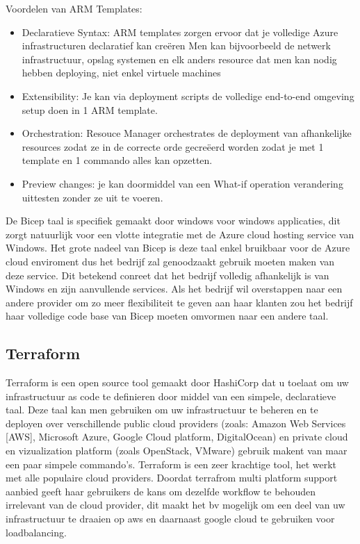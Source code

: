 Voordelen van ARM Templates:
\begin{itemize}
    \item Declaratieve Syntax: ARM templates zorgen ervoor dat je volledige Azure infrastructuren declaratief kan creëren
    Men kan bijvoorbeeld de netwerk infrastructuur, opslag systemen en elk anders resource dat men kan nodig hebben deploying, niet enkel virtuele machines
    \item Extensibility: Je kan via deployment scripts de volledige end-to-end omgeving  setup doen in 1 ARM template.
    \item Orchestration: Resouce Manager orchestrates de deployment van afhankelijke resources zodat ze in de correcte orde gecreëerd worden zodat je met 1 template en 1 commando alles kan opzetten.
    \item Preview changes: je kan doormiddel van een What-if operation verandering uittesten 
    zonder ze uit te voeren.
\end{itemize}
\autocite{ARMTemplates2022}


De Bicep taal is specifiek gemaakt door windows voor windows applicaties, dit zorgt natuurlijk voor een vlotte integratie met de Azure cloud hosting service van Windows.
Het grote nadeel van Bicep is deze taal enkel bruikbaar voor de Azure cloud enviroment dus het bedrijf zal genoodzaakt gebruik moeten maken van deze service.
Dit betekend conreet dat het bedrijf volledig afhankelijk is van Windows en zijn aanvullende services. Als het bedrijf wil overstappen naar een andere provider om zo meer flexibiliteit te geven aan haar klanten
zou het bedrijf haar volledige code base van Bicep moeten omvormen naar een andere taal. 

\subsection{Terraform}%

Terraform is een open source tool gemaakt door HashiCorp dat u toelaat om uw infrastructuur as code te definieren door middel van een simpele, declaratieve taal.
Deze taal kan men gebruiken om  uw infrastructuur te beheren en te deployen over verschillende public cloud providers (zoals: Amazon Web Services [AWS], Microsoft Azure, Google Cloud platform, DigitalOcean) 
en private cloud en vizualization platform (zoals OpenStack, VMware) gebruik makent van maar een paar simpele commando's.
Terraform is een zeer krachtige tool, het werkt met alle populaire cloud providers. Doordat terrafrom multi platform support aanbied geeft haar gebruikers de kans om dezelfde workflow te behouden irrelevant van de cloud provider,
dit maakt het bv mogelijk om een deel van uw infrastructuur te draaien op aws en daarnaast google cloud te gebruiken voor loadbalancing.    
\autocite{Oguejiofor2022}

